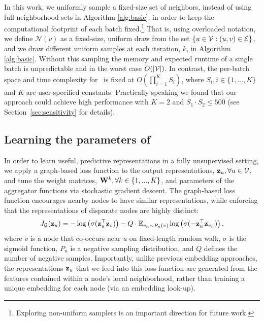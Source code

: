 In this work, we uniformly sample a fixed-size set of neighbors, instead of using full neighborhood sets in Algorithm \ref{alg:basic}, in order to keep the computational footprint of each batch fixed.\footnote{Exploring non-uniform samplers is an important direction for future work.}
That is, using overloaded notation, we define $\mathcal{N}(v)$ as a fixed-size, uniform draw from the set $\{u \in \mathcal{V} : (u,v) \in \mathcal{E}\}$, and we draw different uniform samples at each iteration, $k$, in Algorithm \ref{alg:basic}. 
Without this sampling the memory and expected runtime of a single batch is unpredictable and in the worst case $O(|\mathcal{V}|)$.
In contrast, the per-batch space and time complexity for \name\ is fixed at $O(\prod_{i=1}^{K}S_i)$, where $S_i, i \in \{1,...,K\}$ and $K$ are user-specified constants.
Practically speaking we found that our approach could achieve high performance with $K=2$ and $S_1\cdot S_2 \leq 500$ (see Section~\ref{sec:sensitivity} for details).


\subsection{Learning the parameters of \name}\label{sec:learning}  
In order to learn useful, predictive representations in a fully unsupervised setting, we apply a graph-based loss function to the output representations, $\mathbf{z}_u, \forall u \in {\mathcal{V}}$, and tune the weight matrices, $\mathbf{W}^k, \forall k \in \{1,...,K\}$,  and parameters of the aggregator functions via stochastic gradient descent. 
The graph-based loss function encourages nearby nodes to have similar representations, while enforcing that the representations of disparate nodes are highly distinct:
\begin{equation}\label{eq:neg}
J_{\mathcal{G}}(\mathbf{z}_u) = -\log\left(\sigma(\mathbf{z}^\top_u\mathbf{z}_{v}) \right) - Q\cdot\mathbb{E}_{v_{n} \sim P_n(v)}\log\left(\sigma(-\mathbf{z}^\top_u\mathbf{z}_{v_{n}})\right),
\end{equation}
where $v$ is a node that co-occurs near $u$ on fixed-length random walk, $\sigma$ is the sigmoid function, $P_n$ is a negative sampling distribution, and $Q$ defines the number of negative samples. 
Importantly, unlike previous embedding approaches, the representations $\mathbf{z}_u$ that we feed into this loss function are generated from the features contained within a node's local neighborhood, rather than training a unique embedding for each node (via an embedding look-up). 

